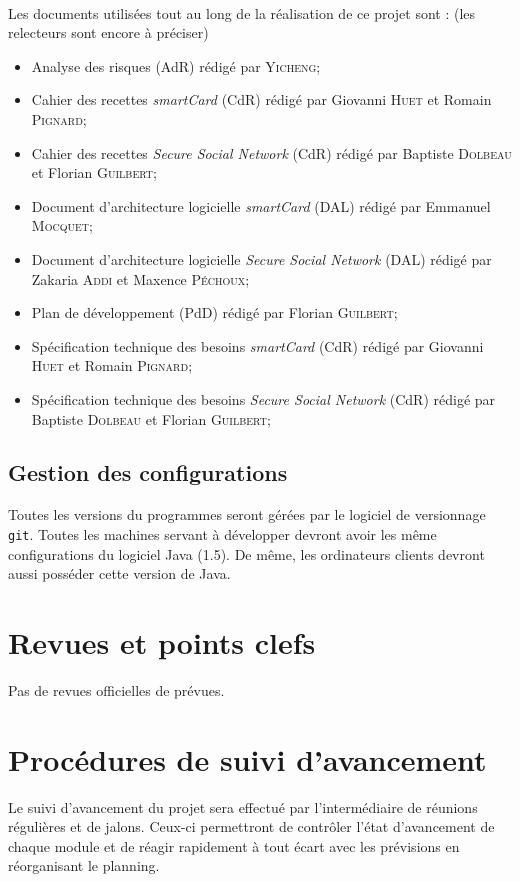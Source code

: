 \documentclass[a4paper,11pt,french]{article}
\begin{document}
\paragraph{}
Les documents utilisées tout au long de la réalisation de ce projet sont : 
(les relecteurs sont encore à préciser)
\begin{itemize}
 \item Analyse des risques (AdR) rédigé par \textsc{Yicheng};
 \item Cahier des recettes \emph{smartCard} (CdR) rédigé par Giovanni 
\textsc{Huet} et Romain \textsc{Pignard};
 \item Cahier des recettes \emph{Secure Social Network} (CdR) rédigé par 
 Baptiste \textsc{Dolbeau} et Florian \textsc{Guilbert};
 \item Document d'architecture logicielle \emph{smartCard} (DAL) rédigé par 
 Emmanuel \textsc{Mocquet};
 \item Document d'architecture logicielle \emph{Secure Social Network} (DAL) 
 rédigé par Zakaria \textsc{Addi} et Maxence \textsc{Péchoux};
 \item Plan de développement (PdD) rédigé par Florian \textsc{Guilbert};
 \item Spécification technique des besoins \emph{smartCard} (CdR) rédigé par 
 Giovanni \textsc{Huet} et Romain \textsc{Pignard};
 \item Spécification technique des besoins \emph{Secure Social Network} (CdR) 
    rédigé par Baptiste \textsc{Dolbeau} et Florian \textsc{Guilbert};
\end{itemize}

\subsection{Gestion des configurations}
Toutes les versions du programmes seront gérées par le logiciel de versionnage 
\texttt{git}. Toutes les machines servant à développer devront
avoir les même configurations du logiciel Java (1.5). De même, les 
ordinateurs clients devront aussi posséder cette version de Java.

\section{Revues et points clefs}
Pas de revues officielles de prévues.

\section{Procédures de suivi d'avancement}
Le suivi d'avancement du projet sera effectué par l'intermédiaire de réunions
régulières et de jalons. Ceux-ci permettront de contrôler l'état d'avancement
de chaque module et de réagir rapidement à tout écart avec les prévisions en
réorganisant le planning.
\end{document}
